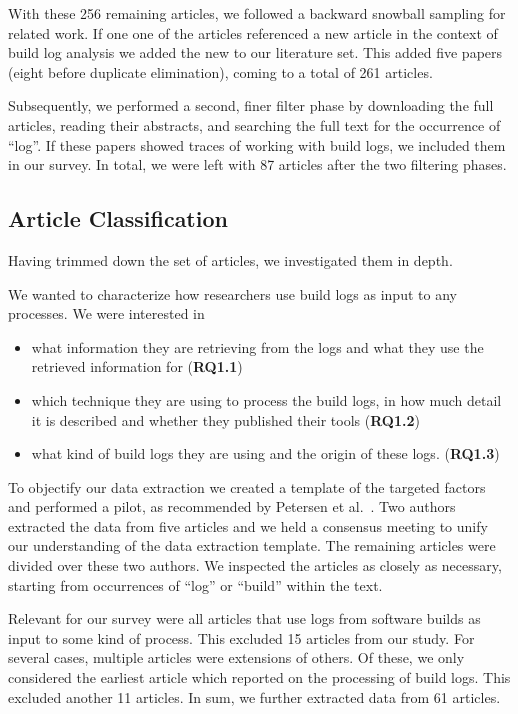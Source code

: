 With these 256 remaining articles, we followed a backward snowball
sampling for related work.
If one one of the articles referenced a new article in the context
of build log analysis we added the new to our literature set.
This added five papers (eight before
duplicate elimination), coming to a total of 261
articles.

Subsequently, we performed a second, finer filter phase by downloading the
full articles, reading their abstracts, and searching the full text
for the occurrence of ``log''.
If these papers showed traces of
working with build logs, we included them in our survey.
In total, we
were left with 87 articles after the two filtering phases.

\subsection{Article Classification}
Having trimmed down the set of articles, we investigated them in depth.

We wanted to characterize how researchers use build logs as input to
any processes.
We were interested in
\begin{itemize}
  \item what information they are retrieving from the logs and
  what they use the retrieved information for (\textbf{RQ1.1})
  \item which technique they are using to process the build logs,
  in how much detail it is described and whether they published their
  tools (\textbf{RQ1.2})
  \item what kind of build logs they are using and the origin of these
  logs.
(\textbf{RQ1.3})
\end{itemize}
To objectify our data extraction we created a template of the targeted
factors and performed a pilot, as recommended by Petersen et
al.~\cite{petersen2015guidelines}.
Two authors extracted the data from five articles and we held a
consensus meeting to unify our understanding
of the data extraction template.
The remaining articles were divided over these two authors.
We inspected the articles as closely as necessary,
starting from occurrences of ``log'' or ``build'' within the text.

Relevant for our survey were all articles that
use logs from software builds as input to
some kind of process.
This excluded 15 articles from our study.
For several cases, multiple articles were extensions of others.
Of these, we only considered the earliest article which reported on
the processing of build logs.
This excluded another 11 articles.
In sum, we further extracted data from 61 articles.

